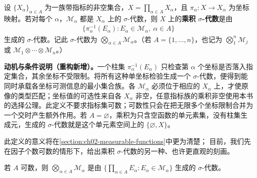 \documentclass[../../main.tex]{subfiles}%
\begin{document}
\begin{definition}[乘积 $\sigma$-代数]\label{definition:ch01-product-sigma-algebra-start}
设 $\{X_\alpha\}_{\alpha\in A}$ 为一族带指标的非空集合，$X=\prod_{\alpha\in A}X_\alpha$，且 $\pi_\alpha:X\to X_\alpha$ 为坐标映射。若对每个 $\alpha$，$\mathscr{M}_\alpha$ 都是 $X_\alpha$ 上的 $\sigma$-代数，则 $X$ 上的\textbf{乘积 $\sigma$-代数}是由
\begin{align*}
\{\pi_\alpha^{-1}(E_\alpha):E_\alpha\in\mathscr{M}_\alpha,\ \alpha\in A\}
\end{align*}
生成的 $\sigma$-代数。记此 $\sigma$-代数为 $\bigotimes_{\alpha\in A}\mathscr{M}_\alpha$。（若 $A=\{1,\ldots,n\}$，也记为 $\bigotimes_1^n\mathscr{M}_j$ 或 $\mathscr{M}_1\otimes\cdots\otimes\mathscr{M}_n$。）
\end{definition}
\begin{remark}
\textbf{动机与条件说明（重构新增）。}一个柱集 $\pi_\alpha^{-1}(E_\alpha)$ 只检查第 $\alpha$ 个坐标是否落入指定集合，其余坐标不受限制。将所有这种单坐标检验生成一个 $\sigma$-代数，便得到能同时承载各坐标可测信息的最小集合族。各 $\mathscr{M}_\alpha$ 必须位于相应的 $X_\alpha$ 上，才使原像的类型匹配；坐标值的可选性来自各 $X_\alpha$ 非空，任意指标族的乘积非空使用本书的选择公理。此定义不要求指标集可数；可数性只会在把无限多个坐标限制合并为一个交时产生额外作用。若 $A=\varnothing$，乘积为只含空函数的单元素集，没有柱集生成元，生成的 $\sigma$-代数就是这个单元素空间上的 $\{\varnothing,X\}$。
\end{remark}

此定义的意义将在\cref{section:ch02-measurable-functions}中更为清楚；
目前，我们先在因子个数可数的情形下，给出乘积 $\sigma$-代数的另一种、也许更直观的刻画。

\begin{proposition}\label{proposition:ch01-countable-product-generators}
若 $A$ 可数，则 $\bigotimes_{\alpha\in A}\mathscr{M}_\alpha$ 是由 $\{\prod_{\alpha\in A}E_\alpha:E_\alpha\in\mathscr{M}_\alpha\}$ 生成的 $\sigma$-代数。
\end{proposition}
\end{document}
